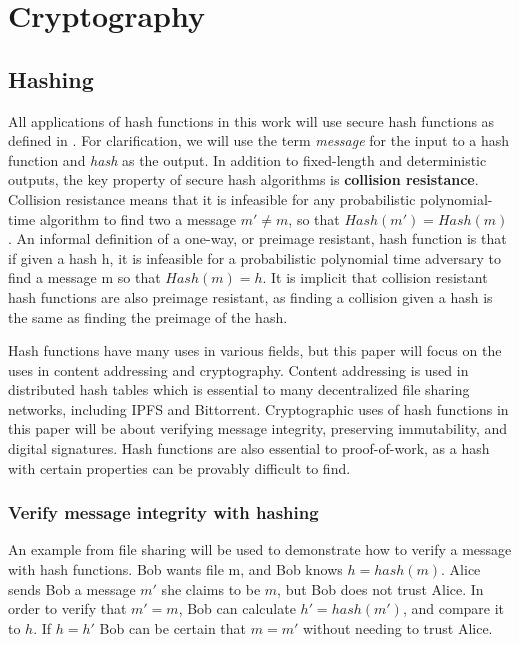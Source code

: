 \section{Cryptography}
\label{sec:cryptography}

\subsection{Hashing}

All applications of hash functions in this work will use secure hash functions as defined in \cite[p.~153-156]{lindell2014introduction}. For clarification, we will use the term \emph{message} for the input to a hash function and \emph{hash} as the output. In addition to fixed-length and deterministic outputs, the key property of secure hash algorithms is \textbf{collision resistance}. Collision resistance means that it is infeasible for any probabilistic polynomial-time algorithm to find two a message $m' \neq m$, so that $Hash(m') = Hash(m)$. An informal definition of a one-way, or preimage resistant, hash function is that if given a hash h, it is infeasible for a probabilistic polynomial time adversary to find a message m so that $Hash(m) = h$. It is implicit that collision resistant hash functions are also preimage resistant, as finding a collision given a hash is the same as finding the preimage of the hash. \cite[p.~156]{lindell2014introduction}

Hash functions have many uses in various fields, but this paper will focus on the uses in content addressing and cryptography. Content addressing is used in distributed hash tables which is essential to many decentralized file sharing networks, including IPFS and Bittorrent. Cryptographic uses of hash functions in this paper will be about verifying message integrity, preserving immutability, and digital signatures. Hash functions are also essential to proof-of-work, as a hash with certain properties can be provably difficult to find. \cite{dwork1992pricing}

\subsubsection{Verify message integrity with hashing}

An example from file sharing will be used to demonstrate how to verify a message with hash functions. Bob wants file m, and Bob knows $h = hash(m)$. Alice sends Bob a message $m'$ she claims to be $m$, but Bob does not trust Alice. In order to verify that $m' = m$, Bob can calculate $h' = hash(m')$, and compare it to $h$. If $h = h'$ Bob can be certain that $m = m'$ without needing to trust Alice. 


